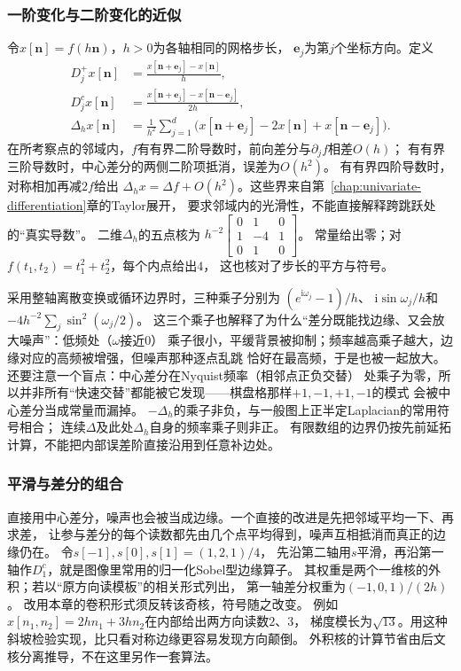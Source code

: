 \subsubsection{一阶变化与二阶变化的近似}
令$x[\bm n]=f(h\bm n)$，$h>0$为各轴相同的网格步长，
$\bm e_j$为第$j$个坐标方向。定义
\begin{equation}
 \begin{aligned}
 D_j^+x[\bm n]&=\frac{x[\bm n+\bm e_j]-x[\bm n]}h,\\
 D_j^cx[\bm n]&=\frac{x[\bm n+\bm e_j]-x[\bm n-\bm e_j]}{2h},\\
 \Delta_hx[\bm n]&=\frac1{h^2}\sum_{j=1}^d
 \bigl(x[\bm n+\bm e_j]-2x[\bm n]+x[\bm n-\bm e_j]\bigr).
 \end{aligned}
 \label{eq:signal-grid-differences}
\end{equation}
在所考察点的邻域内，$f$有有界二阶导数时，前向差分与$\partial_jf$相差$O(h)$；
有有界三阶导数时，中心差分的两侧二阶项抵消，误差为$O(h^2)$。
有有界四阶导数时，对称相加再减$2f$给出
$\Delta_hx=\Delta f+O(h^2)$。这些界来自第~\ref{chap:univariate-differentiation}章的Taylor展开，
要求邻域内的光滑性，不能直接解释跨跳跃处的“真实导数”。
二维$\Delta_h$的五点核为
$h^{-2}\begin{bmatrix}0&1&0\\1&-4&1\\0&1&0\end{bmatrix}$。
常量给出零；对$f(t_1,t_2)=t_1^2+t_2^2$，每个内点给出$4$，
这也核对了步长的平方与符号。

采用整轴离散变换或循环边界时，三种乘子分别为
$(e^{\mathrm i\omega_j}-1)/h$、
$\mathrm i\sin\omega_j/h$和
$-4h^{-2}\sum_j\sin^2(\omega_j/2)$。
这三个乘子也解释了为什么“差分既能找边缘、又会放大噪声”：低频处（$\omega$接近$0$）
乘子很小，平缓背景被抑制；频率越高乘子越大，边缘对应的高频被增强，但噪声那种逐点乱跳
恰好在最高频，于是也被一起放大。还要注意一个盲点：中心差分在Nyquist频率（相邻点正负交替）
处乘子为零，所以并非所有“快速交替”都能被它发现——棋盘格那样$+1,-1,+1,-1$的模式
会被中心差分当成常量而漏掉。
$-\Delta_h$的乘子非负，与一般图上正半定Laplacian的常用符号相合；
连续$\Delta$及此处$\Delta_h$自身的频率乘子则非正。
有限数组的边界仍按先前延拓计算，不能把内部误差阶直接沿用到任意补边处。

\subsubsection{平滑与差分的组合}
直接用中心差分，噪声也会被当成边缘。一个直接的改进是先把邻域平均一下、再求差，
让参与差分的每个读数都先由几个点平均得到，噪声互相抵消而真正的边缘仍在。
令$s[-1],s[0],s[1]=(1,2,1)/4$，
先沿第二轴用$s$平滑，再沿第一轴作$D_1^c$，就是图像里常用的归一化Sobel型边缘算子。
其权重是两个一维核的外积；若以“原方向读模板”的相关形式列出，
第一轴差分权重为$(-1,0,1)/(2h)$。
改用本章的卷积形式须反转该奇核，符号随之改变。
例如$x[n_1,n_2]=2hn_1+3hn_2$在内部给出两方向读数$2$、$3$，
梯度模长为$\sqrt{13}$。用这种斜坡检验实现，比只看对称边缘更容易发现方向颠倒。
外积核的计算节省由后文核分离推导，不在这里另作一套算法。

